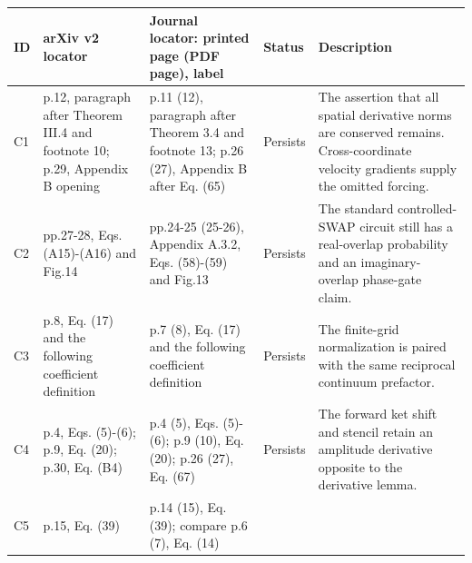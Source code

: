 \begin{longtable}[]{@{}
  >{\raggedright\arraybackslash}p{}
  >{\raggedright\arraybackslash}p{}
  >{\raggedright\arraybackslash}p{}
  >{\raggedright\arraybackslash}p{}
  >{\raggedright\arraybackslash}p{}@{}}
\toprule\noalign{}
\begin{minipage}[b]{\linewidth}\raggedright
ID
\end{minipage} & \begin{minipage}[b]{\linewidth}\raggedright
arXiv v2 locator
\end{minipage} & \begin{minipage}[b]{\linewidth}\raggedright
Journal locator: printed page (PDF page), label
\end{minipage} & \begin{minipage}[b]{\linewidth}\raggedright
Status
\end{minipage} & \begin{minipage}[b]{\linewidth}\raggedright
Description
\end{minipage} \\
\midrule\noalign{}
\endhead
\bottomrule\noalign{}
\endlastfoot
C1 & p.12, paragraph after Theorem III.4 and footnote 10; p.29, Appendix
B opening & p.11 (12), paragraph after Theorem 3.4 and footnote 13; p.26
(27), Appendix B after Eq. (65) & Persists & The assertion that all
spatial derivative norms are conserved remains. Cross-coordinate
velocity gradients supply the omitted forcing. \\
C2 & pp.27-28, Eqs. (A15)-(A16) and Fig.14 & pp.24-25 (25-26), Appendix
A.3.2, Eqs. (58)-(59) and Fig.13 & Persists & The standard
controlled-SWAP circuit still has a real-overlap probability and an
imaginary-overlap phase-gate claim. \\
C3 & p.8, Eq. (17) and the following coefficient definition & p.7 (8),
Eq. (17) and the following coefficient definition & Persists & The
finite-grid normalization is paired with the same reciprocal continuum
prefactor. \\
C4 & p.4, Eqs. (5)-(6); p.9, Eq. (20); p.30, Eq. (B4) & p.4 (5), Eqs.
(5)-(6); p.9 (10), Eq. (20); p.26 (27), Eq. (67) & Persists & The
forward ket shift and stencil retain an amplitude derivative opposite to
the derivative lemma. \\
C5 & p.15, Eq. (39) & p.14 (15), Eq. (39); compare p.6 (7), Eq. (14) &

\end{longtable}
